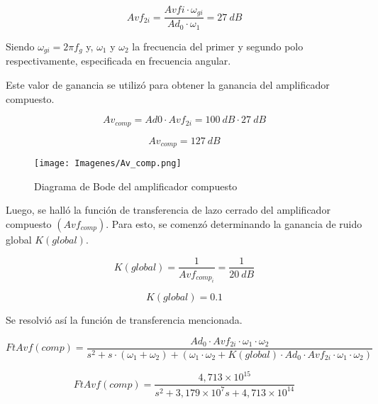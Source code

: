 \documentclass[12pt,A4paper,titlepage]{article}
\begin{document}
\begin{equation}
    Avf_{2i}=\frac{Avfi \cdot \omega_{gi}}{Ad_0 \cdot \omega_1} = 27~dB
\end{equation}

\bigskip
\hspace{1mm} Siendo \( \omega _{gi} = 2\pi f_g \)
y, \( \omega _1 \) y  \(\omega _2\) la frecuencia del primer y segundo polo respectivamente, especificada en frecuencia angular.


\bigskip
\hspace{1mm} Este valor de ganancia se utilizó para obtener la ganancia del amplificador compuesto.

\begin{equation}
    Av_{comp}=Ad0\cdot Avf_{2i}=100~dB \cdot 27~dB
\end{equation}

\begin{equation}
    \boxed{
    Av_{comp} = 127~dB
    }
\end{equation}

\begin{figure}[!h]
    \centering
    \texttt{[image: Imagenes/Av\_comp.png]}
    \caption{Diagrama de Bode del amplificador compuesto}
\end{figure}

\bigskip
\hspace{1mm} Luego, se halló la función de transferencia de lazo cerrado del amplificador compuesto \((Avf_{comp})\). Para esto, se comenzó determinando la ganancia de ruido global \( K(global) \).

\begin{equation}
    K (global) = \frac{1}{Avf_{comp_i}} = \frac{1}{20~dB}
\end{equation}

\begin{equation}
    \boxed{
    K (global) = 0.1
    }
\end{equation}

\bigskip
\hspace{1mm} Se resolvió así la función de transferencia mencionada.

\begin{equation}
    FtAvf (comp) = \frac{Ad_0 \cdot Avf_{2i} \cdot \omega_1 \cdot \omega_2}{s^2 + s \cdot (\omega_1 + \omega_2) + (\omega_1 \cdot \omega_2 + K (global) \cdot Ad_0 \cdot Avf_{2i} \cdot \omega_1 \cdot \omega_2)}
\end{equation}

\begin{equation}
    FtAvf (comp) = \frac{4,713 \times 10^15}{s^2 + 3,179 \times 10^7 s + 4,713 \times 10^14}
\end{equation}
\end{document}
